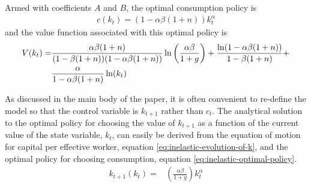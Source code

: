 \documentclass[11pt]{article}
\begin{document}
Armed with coefficients $A$ and $B$, the optimal consumption policy is
\begin{align}\label{eq:inelastic-optimal-policy}
c(k_t) = (1 - \alpha\beta(1+n))k_t^{\alpha}
\end{align}
and the value function associated with this optimal policy is
\begin{align}
V(k_t) =& \frac{\alpha\beta(1+n)}{(1-\beta(1+n))(1-\alpha\beta(1+n))}
\ln\left(\frac{\alpha\beta}{1+g}\right)  
+ \frac{\ln(1-\alpha\beta(1+n))}{1 - \beta(1+n)} + \\ \notag
& \frac{\alpha}{1 - \alpha\beta(1+n)}\ln(k_t)
\end{align}

As discussed in the main body of the paper, it is often convenient to
re-define the model so that the control variable is $k_{t+1}$ rather
than $c_t$. The analytical solution to the optimal policy for choosing
the value of $k_{t+1}$ as a function of the current value of the state
variable, $k_t$, can easily be derived from the equation of motion for
capital per effective worker, equation
\ref{eq:inelastic-evolution-of-k}, and the optimal policy for
choosing consumption, equation \ref{eq:inelastic-optimal-policy}.
\begin{align}
k_{t+1}(k_t) =& \left(\frac{\alpha\beta}{1+g}\right)k_t^{\alpha}
\end{align}




			
\end{document}
